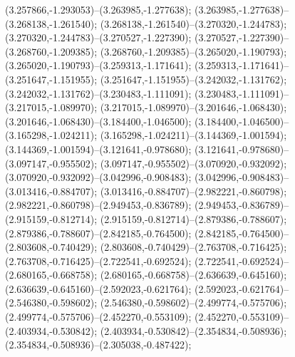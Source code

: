  (3.257866,-1.293053)--(3.263985,-1.277638);
 (3.263985,-1.277638)--(3.268138,-1.261540);
 (3.268138,-1.261540)--(3.270320,-1.244783);
 (3.270320,-1.244783)--(3.270527,-1.227390);
 (3.270527,-1.227390)--(3.268760,-1.209385);
 (3.268760,-1.209385)--(3.265020,-1.190793);
 (3.265020,-1.190793)--(3.259313,-1.171641);
 (3.259313,-1.171641)--(3.251647,-1.151955);
 (3.251647,-1.151955)--(3.242032,-1.131762);
 (3.242032,-1.131762)--(3.230483,-1.111091);
 (3.230483,-1.111091)--(3.217015,-1.089970);
 (3.217015,-1.089970)--(3.201646,-1.068430);
 (3.201646,-1.068430)--(3.184400,-1.046500);
 (3.184400,-1.046500)--(3.165298,-1.024211);
 (3.165298,-1.024211)--(3.144369,-1.001594);
 (3.144369,-1.001594)--(3.121641,-0.978680);
 (3.121641,-0.978680)--(3.097147,-0.955502);
 (3.097147,-0.955502)--(3.070920,-0.932092);
 (3.070920,-0.932092)--(3.042996,-0.908483);
 (3.042996,-0.908483)--(3.013416,-0.884707);
 (3.013416,-0.884707)--(2.982221,-0.860798);
 (2.982221,-0.860798)--(2.949453,-0.836789);
 (2.949453,-0.836789)--(2.915159,-0.812714);
 (2.915159,-0.812714)--(2.879386,-0.788607);
 (2.879386,-0.788607)--(2.842185,-0.764500);
 (2.842185,-0.764500)--(2.803608,-0.740429);
 (2.803608,-0.740429)--(2.763708,-0.716425);
 (2.763708,-0.716425)--(2.722541,-0.692524);
 (2.722541,-0.692524)--(2.680165,-0.668758);
 (2.680165,-0.668758)--(2.636639,-0.645160);
 (2.636639,-0.645160)--(2.592023,-0.621764);
 (2.592023,-0.621764)--(2.546380,-0.598602);
 (2.546380,-0.598602)--(2.499774,-0.575706);
 (2.499774,-0.575706)--(2.452270,-0.553109);
 (2.452270,-0.553109)--(2.403934,-0.530842);
 (2.403934,-0.530842)--(2.354834,-0.508936);
 (2.354834,-0.508936)--(2.305038,-0.487422);
